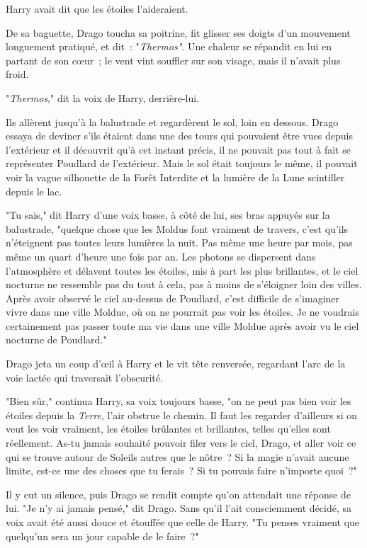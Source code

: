Harry avait dit que les étoiles l'aideraient.

De sa baguette, Drago toucha sa poitrine, fit glisser ses doigts d'un mouvement longuement pratiqué, et dit~: "\emph{Thermos"}. Une chaleur se répandit en lui en partant de son cœur~; le vent vint souffler sur son visage, mais il n'avait plus froid.

"\emph{Thermos}," dit la voix de Harry, derrière-lui.

Ils allèrent jusqu'à la balustrade et regardèrent le sol, loin en dessous. Drago essaya de deviner s'ils étaient dans une des tours qui pouvaient être vues depuis l'extérieur et il découvrit qu'à cet instant précis, il ne pouvait pas tout à fait se représenter Poudlard de l'extérieur. Mais le sol était toujours le même, il pouvait voir la vague silhouette de la Forêt Interdite et la lumière de la Lune scintiller depuis le lac.

"Tu sais," dit Harry d'une voix basse, à côté de lui, ses bras appuyés sur la balustrade, "quelque chose que les Moldus font vraiment de travers, c'est qu'ils n'éteignent pas toutes leurs lumières la nuit. Pas même une heure par mois, pas même un quart d'heure une fois par an. Les photons se dispersent dans l'atmosphère et délavent toutes les étoiles, mis à part les plus brillantes, et le ciel nocturne ne ressemble pas du tout à cela, pas à moins de s'éloigner loin des villes. Après avoir observé le ciel au-dessus de Poudlard, c'est difficile de s'imaginer vivre dans une ville Moldue, où on ne pourrait pas voir les étoiles. Je ne voudrais certainement pas passer toute ma vie dans une ville Moldue après avoir vu le ciel nocturne de Poudlard."

Drago jeta un coup d'œil à Harry et le vit tête renversée, regardant l'arc de la voie lactée qui traversait l'obscurité.

"Bien sûr," continua Harry, sa voix toujours basse, "on ne peut pas bien voir les étoiles depuis la \emph{Terre}, l'air obstrue le chemin. Il faut les regarder d'ailleurs si on veut les voir vraiment, les étoiles brûlantes et brillantes, telles qu'elles sont réellement. As-tu jamais souhaité pouvoir filer vers le ciel, Drago, et aller voir ce qui se trouve autour de Soleils autres que le nôtre~? Si la magie n'avait aucune limite, est-ce une des choses que tu ferais~? Si tu pouvais faire n'importe quoi~?"

Il y eut un silence, puis Drago se rendit compte qu'on attendait une réponse de lui. "Je n'y ai jamais pensé," dit Drago. Sans qu'il l'ait consciemment décidé, sa voix avait été aussi douce et étouffée que celle de Harry. "Tu penses vraiment que quelqu'un sera un jour capable de le faire~?"

